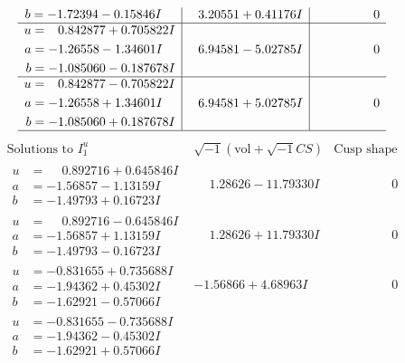 \documentclass[1p]{elsarticle_modified}
\theoremstyle{definition}
\newcommand{\I}{\sqrt{-1}}
\begin{document}
$$\begin{array}{c|c|c}
\begin{aligned}
b &= -1.72394 - 0.15846 I\end{aligned}
 & \phantom{-}3.20551 + 0.41176 I & \phantom{-0.000000 } 0 \\ \hline\begin{aligned}
u &= \phantom{-}0.842877 + 0.705822 I \\
a &= -1.26558 - 1.34601 I \\
b &= -1.085060 - 0.187678 I\end{aligned}
 & \phantom{-}6.94581 - 5.02785 I & \phantom{-0.000000 } 0 \\ \hline\begin{aligned}
u &= \phantom{-}0.842877 - 0.705822 I \\
a &= -1.26558 + 1.34601 I \\
b &= -1.085060 + 0.187678 I\end{aligned}
 & \phantom{-}6.94581 + 5.02785 I & \phantom{-0.000000 } 0\\
 \hline 
 \end{array}$$\newpage$$\begin{array}{c|c|c}  
\text{Solutions to }I^u_{1}& \I (\text{vol} + \sqrt{-1}CS) & \text{Cusp shape}\\
 \hline 
\begin{aligned}
u &= \phantom{-}0.892716 + 0.645846 I \\
a &= -1.56857 - 1.13159 I \\
b &= -1.49793 + 0.16723 I\end{aligned}
 & \phantom{-}1.28626 - 11.79330 I & \phantom{-0.000000 } 0 \\ \hline\begin{aligned}
u &= \phantom{-}0.892716 - 0.645846 I \\
a &= -1.56857 + 1.13159 I \\
b &= -1.49793 - 0.16723 I\end{aligned}
 & \phantom{-}1.28626 + 11.79330 I & \phantom{-0.000000 } 0 \\ \hline\begin{aligned}
u &= -0.831655 + 0.735688 I \\
a &= -1.94362 + 0.45302 I \\
b &= -1.62921 - 0.57066 I\end{aligned}
 & -1.56866 + 4.68963 I & \phantom{-0.000000 } 0 \\ \hline\begin{aligned}
u &= -0.831655 - 0.735688 I \\
a &= -1.94362 - 0.45302 I \\
b &= -1.62921 + 0.57066 I\end{aligned}

\end{array}$$
\end{document}
